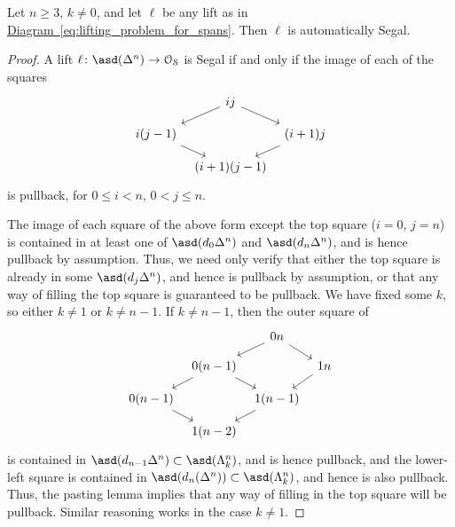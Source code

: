 \documentclass[main.tex]{subfiles}
\begin{document}
\begin{lemma}
  Let $n \geq 3$, $k \neq 0$, and let $\ell$ be any lift as in \hyperref[eq:lifting_problem_for_spans]{Diagram~\ref*{eq:lifting_problem_for_spans}}. Then $\ell$ is automatically Segal.
\end{lemma}
\begin{proof}
  A lift $\ell\colon \asd(\Delta^{n}) \to \OS$ is Segal if and only if the image of each of the squares
  \begin{equation*}
    \begin{tikzcd}[column sep=tiny, row sep=small]
      & ij
      \arrow[dr]
      \arrow[dl]
      \\
      i(j-1)
      \arrow[dr]
      && (i+1)j
      \arrow[dl]
      \\
      & (i+1)(j-1)
    \end{tikzcd}
  \end{equation*}
  is pullback, for $0 \leq i < n$, $0 < j \leq n$. 

  The image of each square of the above form except the top square ($i = 0$, $j = n$) is contained in at least one of $\asd(d_{0}\Delta^{n})$ and $\asd(d_{n}\Delta^{n})$, and is hence pullback by assumption. Thus, we need only verify that either the top square is already in some $\asd(d_{j} \Delta^{n})$, and hence is pullback by assumption, or that any way of filling the top square is guaranteed to be pullback. We have fixed some $k$, so either $k \neq 1$ or $k \neq n-1$. If $k \neq n-1$, then the outer square of
  \begin{equation*}
    \begin{tikzcd}[column sep=tiny, row sep=small]
      && 0n
      \arrow[dl]
      \arrow[dr]
      \\
      & 0(n-1)
      \arrow[dl]
      \arrow[dr]
      && 1n
      \arrow[dl]
      \\
      0(n-1)
      \arrow[dr ]
      && 1(n-1)
      \arrow[dl]
      \\
      & 1(n-2)
    \end{tikzcd}
  \end{equation*}
  is contained in $\asd(d_{n-1} \Delta^{n}) \subset \asd(\Lambda^{n}_{k})$, and is hence pullback, and the lower-left square is contained in $\asd(d_{n}(\Delta^{n})) \subset \asd(\Lambda^{n}_{k})$, and hence is also pullback. Thus, the pasting lemma implies that any way of filling in the top square will be pullback. Similar reasoning works in the case $k \neq 1$.
\end{proof}
\end{document}
